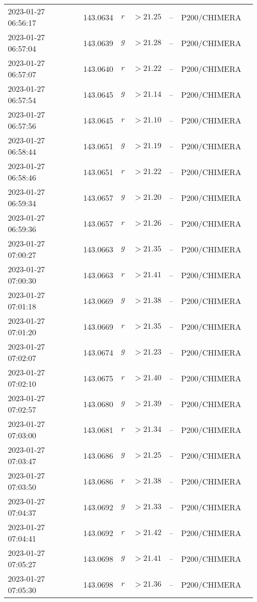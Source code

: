 \documentclass{nature_plusfigure}
\begin{document}
\begin{supplement}
\begin{center}
\begin{longtable}{lllllll}
2023-01-27 06:56:17 & 143.0634 & $r$ & $>21.25$ & -- & P200/CHIMERA &  \\ 
2023-01-27 06:57:04 & 143.0639 & $g$ & $>21.28$ & -- & P200/CHIMERA &  \\ 
2023-01-27 06:57:07 & 143.0640 & $r$ & $>21.22$ & -- & P200/CHIMERA &  \\ 
2023-01-27 06:57:54 & 143.0645 & $g$ & $>21.14$ & -- & P200/CHIMERA &  \\ 
2023-01-27 06:57:56 & 143.0645 & $r$ & $>21.10$ & -- & P200/CHIMERA &  \\ 
2023-01-27 06:58:44 & 143.0651 & $g$ & $>21.19$ & -- & P200/CHIMERA &  \\ 
2023-01-27 06:58:46 & 143.0651 & $r$ & $>21.22$ & -- & P200/CHIMERA &  \\ 
2023-01-27 06:59:34 & 143.0657 & $g$ & $>21.20$ & -- & P200/CHIMERA &  \\ 
2023-01-27 06:59:36 & 143.0657 & $r$ & $>21.26$ & -- & P200/CHIMERA &  \\ 
2023-01-27 07:00:27 & 143.0663 & $g$ & $>21.35$ & -- & P200/CHIMERA &  \\ 
2023-01-27 07:00:30 & 143.0663 & $r$ & $>21.41$ & -- & P200/CHIMERA &  \\ 
2023-01-27 07:01:18 & 143.0669 & $g$ & $>21.38$ & -- & P200/CHIMERA &  \\ 
2023-01-27 07:01:20 & 143.0669 & $r$ & $>21.35$ & -- & P200/CHIMERA &  \\ 
2023-01-27 07:02:07 & 143.0674 & $g$ & $>21.23$ & -- & P200/CHIMERA &  \\ 
2023-01-27 07:02:10 & 143.0675 & $r$ & $>21.40$ & -- & P200/CHIMERA &  \\ 
2023-01-27 07:02:57 & 143.0680 & $g$ & $>21.39$ & -- & P200/CHIMERA &  \\ 
2023-01-27 07:03:00 & 143.0681 & $r$ & $>21.34$ & -- & P200/CHIMERA &  \\ 
2023-01-27 07:03:47 & 143.0686 & $g$ & $>21.25$ & -- & P200/CHIMERA &  \\ 
2023-01-27 07:03:50 & 143.0686 & $r$ & $>21.38$ & -- & P200/CHIMERA &  \\ 
2023-01-27 07:04:37 & 143.0692 & $g$ & $>21.33$ & -- & P200/CHIMERA &  \\ 
2023-01-27 07:04:41 & 143.0692 & $r$ & $>21.42$ & -- & P200/CHIMERA &  \\ 
2023-01-27 07:05:27 & 143.0698 & $g$ & $>21.41$ & -- & P200/CHIMERA &  \\ 
2023-01-27 07:05:30 & 143.0698 & $r$ & $>21.36$ & -- & P200/CHIMERA &  \\ 

\end{longtable}
\end{center}
\end{supplement}
\end{document}
